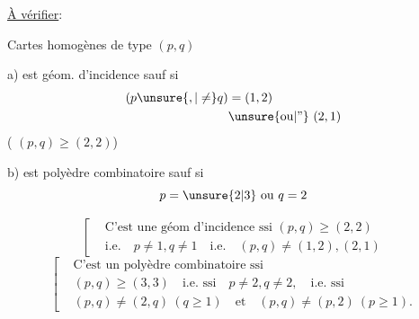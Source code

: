 \uline{À vérifier}:

Cartes  homogènes de type $(p,q)$

 a) est  géom. d'incidence sauf si
\[
\begin{aligned}
(p\unsure{,|\ne}q)&=(1,2)\\
&\text{\unsure{ou|\textquotedblright} }(2,1)
\end{aligned}
\]
(  $(p,q)\ge(2,2)$)


b) est polyèdre combinatoire sauf si
\[p=\unsure{2|3}\ \text{ou}\ q=2\]


\[
\left[\begin{aligned}
&\text{C'est une géom d'incidence ssi }(p,q)\ge(2,2)\\
&\text{i.e.}\quad p\ne1,q\ne1\quad\text{i.e.}\quad(p,q)\ne(1,2),(2,1)
\end{aligned}\right.
\]
\[
\left[\begin{aligned}
&\text{C'est un polyèdre combinatoire ssi}\\
&(p,q)\ge(3,3)\quad\text{i.e. ssi}\quad p\ne2,q\ne2,\quad\text{i.e. ssi}\\
&(p,q)\ne(2,q)\ (q\ge1)\quad\text{et}\quad(p,q)\ne(p,2)\ (p\ge1).
\end{aligned}\right.
\]
